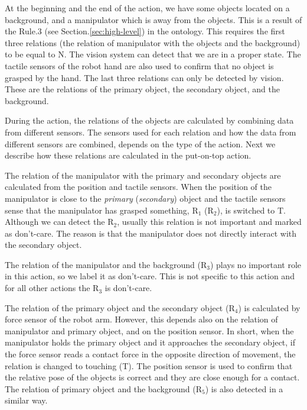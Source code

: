 At the beginning and the end of the action, we have some objects located on a background, and a manipulator which is away from the objects.
This is a result of the Rule.3 (see Section.\ref{sec:high-level}) in the ontology.
This requires the first three relations (the relation of manipulator with the objects and the background) to be equal to N.
The vision system can detect that we are in a proper state.
The tactile sensors of the robot hand are also used to confirm that no object is grasped by the hand.
The last three relations can only be detected by vision.
These are the relations of the primary object, the secondary object, and the background.

During the action, the relations of the objects are calculated by combining data from different sensors.
The sensors used for each relation and how the data from different sensors are combined, depends on the type of the action.
Next we describe how these relations are calculated in the put-on-top action.

The relation of the manipulator with the primary and secondary objects are calculated from the position and tactile sensors.
When the position of the manipulator is close to the \textit{primary} (\textit{secondary}) object and the tactile sensors sense that the manipulator has grasped something,
$\text{R}_1$ ($\text{R}_2$), is switched to T.
Although we can detect the $\text{R}_2$, usually this relation is not important and marked as don't-care.
The reason is that the manipulator does not directly interact with the secondary object.

The relation of the manipulator and the background ($\text{R}_3$) plays no important role in this action, so we label it as don't-care.
This is not specific to this action and for all other actions the $\text{R}_3$ is don't-care.


The relation of the primary object and the secondary object ($\text{R}_4$) is calculated by force sensor of the robot arm.
However, this depends also on the relation of manipulator and primary object, and on the position sensor.
In short, when the manipulator holds the primary object and it approaches the secondary object,
if the force sensor reads a contact force in the opposite direction of movement, the relation is changed to touching (T).
The position sensor is used to confirm that the relative pose of the objects is correct and they are close enough for a contact.
The relation of primary object and the background ($\text{R}_5$) is also detected in a similar way.

